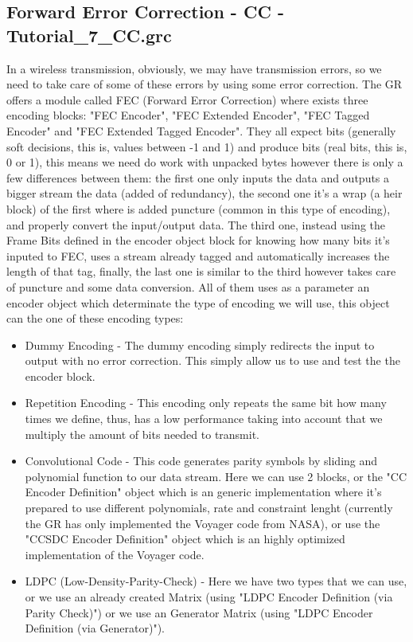 \documentclass[a4paper, 10pt, conference]{ieeeconf}      %
\begin{document}
\subsection{Forward Error Correction - CC - Tutorial\_7\_CC.grc}
    In a wireless transmission, obviously, we may have transmission errors, so we need to take care of some of these errors by using some error correction. The GR offers a module called FEC (Forward Error Correction) where exists three encoding blocks: "FEC Encoder", "FEC Extended Encoder", "FEC Tagged Encoder" and "FEC Extended Tagged Encoder". They all expect bits (generally soft decisions, this is, values between -1 and 1) and produce bits (real bits, this is, 0 or 1), this means we need do work with unpacked bytes however there is only a few differences between them: the first one only inputs the data and outputs a bigger stream the data (added of redundancy), the second one it's a wrap (a heir block) of the first where is added puncture (common in this type of encoding), and properly convert the input/output data. The third one, instead using the Frame Bits defined in the encoder object block for knowing how many bits it's inputed to FEC, uses a stream already tagged and automatically increases the length of that tag, finally, the last one is similar to the third however takes care of puncture and some data conversion. All of them uses as a parameter an encoder object which determinate the type of encoding we will use, this object can the one of these encoding types:
    \begin{itemize}
        \item Dummy Encoding - The dummy encoding simply redirects the input to output with no error correction. This simply allow us to use and test the the encoder block.
        \item Repetition Encoding - This encoding only repeats the same bit how many times we define, thus, has a low performance taking into account that we multiply the amount of bits needed to transmit.
        \item Convolutional Code - This code generates parity symbols by sliding and polynomial function to our data stream. Here we can use 2 blocks, or the "CC Encoder Definition" object which is an generic implementation where it's prepared to use different polynomials, rate and constraint lenght (currently the GR has only implemented the Voyager code from NASA), or use the "CCSDC Encoder Definition" object which is an highly optimized implementation of the Voyager code.
        \item LDPC (Low-Density-Parity-Check) - Here we have two types that we can use, or we use an already created Matrix (using "LDPC Encoder Definition (via Parity Check)") or we use an Generator Matrix (using "LDPC Encoder Definition (via Generator)").
    \end{itemize}
\end{document}
